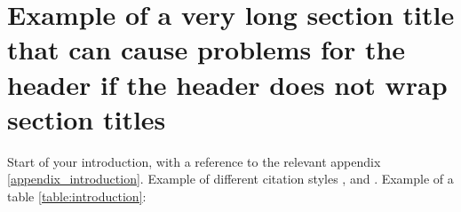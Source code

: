 \section{Example of a very long section title that can cause problems for the header if the header does not wrap section titles}
Start of your introduction, with a reference to the relevant appendix \ref{appendix_introduction}. Example of different citation styles \citep{moore-rayson-2018-bringing}, and \citet{moore-rayson-2018-bringing}. Example of a table \ref{table:introduction}:



\lipsum[2-10]
